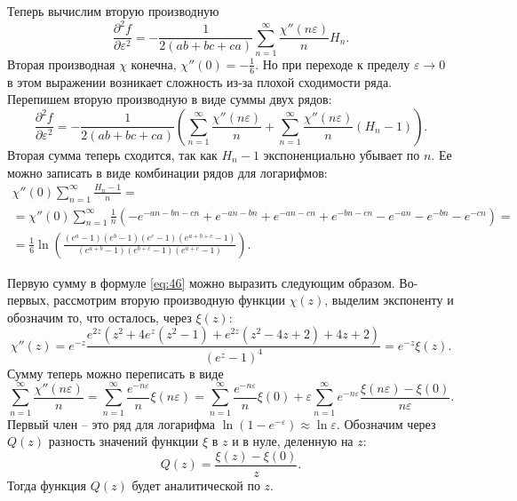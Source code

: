 \documentclass{article}
\begin{document}
Теперь вычислим вторую производную
\begin{equation}
  \label{eq:44}
\frac{\partial^{2} f}{\partial
  \varepsilon^{2}}=-\frac{1}{2(ab+bc+ca)} \sum _{n=1}^{\infty} \frac{\chi''(n\varepsilon)}{n} H_{n}.  
\end{equation}
Вторая производная  $\chi$ конечна,  $\chi''(0)=-\frac{1}{6}$. Но при переходе к пределу
$\varepsilon\to 0$ в этом выражении возникает сложность из-за плохой сходимости ряда. Перепишем
вторую производную в виде суммы двух рядов:
\begin{equation}
  \label{eq:46}
\frac{\partial^{2} f}{\partial
  \varepsilon^{2}}=-\frac{1}{2(ab+bc+ca)} \left(\sum _{n=1}^{\infty} \frac{\chi''(n\varepsilon)}{n}+
  \sum_{n=1}^{\infty} \frac{\chi''(n\varepsilon)}{n}(H_{n}-1)\right).    
\end{equation}
Вторая сумма теперь сходится, так как  $H_{n}-1$ экспоненциально убывает по $n$. Ее можно записать в
виде комбинации рядов для логарифмов:
\begin{multline}
  \label{eq:47}
  \chi''(0)\sum_{n=1}^{\infty} \frac{H_{n}-1}{n}=\\=\chi''(0)\sum_{n=1}^{\infty}\frac{1}{n}\left(-e^{-a
      n-b n-c n}+e^{-a n-b n}+e^{-a n-c n}+e^{-b n-c n} - e^{-a n}-e^{-b n}-e^{-c n}\right)=\\
  =\frac{1}{6}\ln\left(\frac{(e^{a}-1)(e^{b}-1)(e^{c}-1)(e^{a+b+c}-1)}{(e^{a+b}-1)(e^{b+c}-1)(e^{a+c}-1)}\right).
\end{multline}

Первую сумму в формуле  \eqref{eq:46} можно выразить следующим образом. Во-первых, рассмотрим вторую
производную функции $\chi(z)$, выделим экспоненту и обозначим то, что осталось, через $\xi(z)$:
\begin{equation}
  \label{eq:48}
  \chi''(z)=e^{-z}\frac{e^{2 z} \left(z^2+4 e^z
   \left(z^2-1\right)+e^{2 z} \left(z^2-4
   z+2\right)+4
   z+2\right)}{\left(e^z-1\right)^4}=e^{-z}\xi(z).
\end{equation}
Сумму теперь можно переписать в виде
\begin{equation}
  \label{eq:49}
  \sum _{n=1}^{\infty} \frac{\chi''(n\varepsilon)}{n}=
  \sum_{n=1}^{\infty}\frac{e^{-n\varepsilon}}{n}\xi(n\varepsilon) =
  \sum_{n=1}^{\infty}\frac{e^{-n\varepsilon}}{n}\xi(0)+  \varepsilon\sum_{n=1}^{\infty}e^{-n\varepsilon}\frac{\xi(n\varepsilon)-\xi(0)}{n\varepsilon}.
\end{equation}
Первый член -- это ряд для логарифма $\ln\left(1-e^{-\varepsilon}\right)\approx \ln
\varepsilon$. Обозначим через  $Q(z)$ разность значений функции $\xi$ в $z$ и в нуле, деленную на $z$:
\begin{equation}
  \label{eq:85}
  Q(z)=\frac{\xi(z)-\xi(0)}{z}.
\end{equation}
Тогда функция  $Q(z)$ будет аналитической по $z$.
\end{document}
